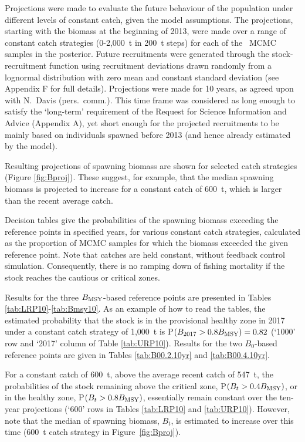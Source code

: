 Projections were made to evaluate the future behaviour of the population under different levels of constant catch, given the model assumptions.  The projections, starting with the biomass at the beginning of 2013, were made over a range of constant catch strategies (0-2,000~t in 200~t steps) for each of the \numMCMC~MCMC samples in the posterior. Future recruitments were generated through the stock-recruitment function using recruitment deviations drawn randomly from a lognormal distribution with zero mean and constant standard deviation (see Appendix F for full details). Projections were made for 10 years, as agreed upon with N.~Davis (pers.~comm.). This time frame was considered as long enough to satisfy the `long-term' requirement of the Request for Science Information and Advice (Appendix A), yet short enough for the projected recruitments to be mainly based on individuals spawned before 2013 (and hence already estimated by the model).

Resulting projections of spawning biomass are shown for selected catch strategies (Figure \ref{fig:Bproj}). These suggest, for example, that the median spawning biomass is projected to increase for a constant catch of 600~t, which is larger than the recent average catch. 

Decision tables give the probabilities of the spawning biomass exceeding the reference points in specified years, for various constant catch strategies, calculated as the proportion of MCMC samples for which the biomass exceeded the given reference point. Note that catches are held constant, without feedback control simulation. Consequently, there is no ramping down of fishing mortality if the stock reaches the cautious or critical zones.

Results for the three $B_\mathrm{MSY}$-based reference points are presented in Tables \ref{tab:LRP10}-\ref{tab:Bmsy10}. As an example of how to read the tables, the estimated probability that the stock is in the provisional healthy zone in 2017 under a constant catch strategy of 1,000~t is P$(B_{2017} > 0.8 B_\mathrm{MSY})=0.82$ (`1000' row and `2017' column of Table \ref{tab:URP10}). Results for the two $B_0$-based reference points are given in Tables \ref{tab:B00.2.10yr} and \ref{tab:B00.4.10yr}. 

For a constant catch of 600~t, above the average recent catch of 547~t, the probabilities of the stock remaining above the critical zone, P$(B_{t} > 0.4 B_\mathrm{MSY})$, or in the healthy zone, P$(B_{t} > 0.8 B_\mathrm{MSY})$, essentially remain constant over the ten-year projections (`600' rows in Tables \ref{tab:LRP10} and \ref{tab:URP10}). However, note that the median of spawning biomass, $B_t$, is estimated to increase over this time (600~t catch strategy in Figure~\ref{fig:Bproj}).

